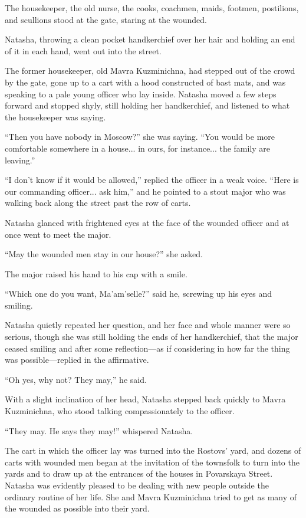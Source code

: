 The housekeeper, the old nurse, the cooks, coachmen, maids,
footmen, postilions, and scullions stood at the gate, staring at
the wounded.

Natasha, throwing a clean pocket handkerchief over her hair and
holding an end of it in each hand, went out into the street.

The former housekeeper, old Mavra Kuzminichna, had stepped out of
the crowd by the gate, gone up to a cart with a hood constructed
of bast mats, and was speaking to a pale young officer who lay
inside. Natasha moved a few steps forward and stopped shyly,
still holding her handkerchief, and listened to what the
housekeeper was saying.

``Then you have nobody in Moscow?'' she was saying. ``You would
be more comfortable somewhere in a house... in ours, for
instance... the family are leaving.''

``I don't know if it would be allowed,'' replied the officer in a
weak voice. ``Here is our commanding officer... ask him,'' and he
pointed to a stout major who was walking back along the street
past the row of carts.

Natasha glanced with frightened eyes at the face of the wounded
officer and at once went to meet the major.

``May the wounded men stay in our house?'' she asked.

The major raised his hand to his cap with a smile.

``Which one do you want, Ma'am'selle?'' said he, screwing up his
eyes and smiling.

Natasha quietly repeated her question, and her face and whole
manner were so serious, though she was still holding the ends of
her handkerchief, that the major ceased smiling and after some
reflection---as if considering in how far the thing was
possible---replied in the affirmative.

``Oh yes, why not? They may,'' he said.

With a slight inclination of her head, Natasha stepped back
quickly to Mavra Kuzminichna, who stood talking compassionately
to the officer.

``They may. He says they may!'' whispered Natasha.

The cart in which the officer lay was turned into the Rostovs'
yard, and dozens of carts with wounded men began at the
invitation of the townsfolk to turn into the yards and to draw up
at the entrances of the houses in Povarskaya Street. Natasha was
evidently pleased to be dealing with new people outside the
ordinary routine of her life. She and Mavra Kuzminichna tried to
get as many of the wounded as possible into their yard.

